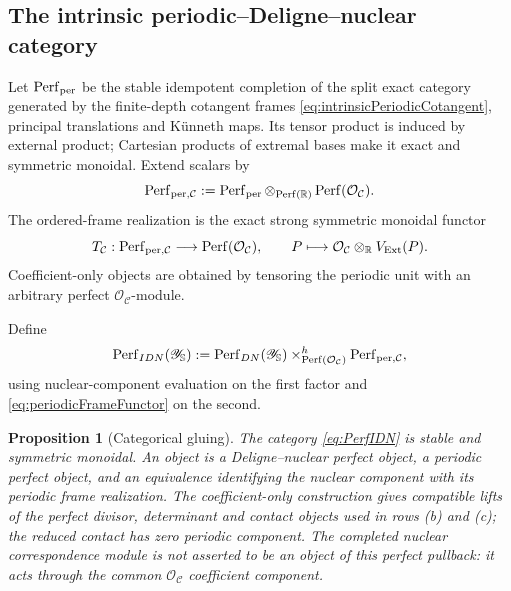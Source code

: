 \documentclass[11pt]{amsart}
\newtheorem{proposition}[theorem]{Proposition}
\theoremstyle{definition}
\theoremstyle{remark}
\newcommand{\R}{\mathbb R}
\begin{document}
\subsection{The intrinsic periodic--Deligne--nuclear category}

Let $\operatorname{Perf}_{\rm per}$ be the stable idempotent completion of
the split exact category generated by the finite-depth cotangent frames
\eqref{eq:intrinsicPeriodicCotangent}, principal translations and K\"unneth
maps.  Its tensor product is induced by external product; Cartesian
products of extremal bases make it exact and symmetric monoidal.  Extend
scalars by
\begin{equation}\label{eq:periodicNuclearCategory}
 \operatorname{Perf}_{\rm per,\mathcal C}
 :=\operatorname{Perf}_{\rm per}
   \otimes_{\operatorname{Perf}(\R)}
   \operatorname{Perf}(\mathcal O_{\mathcal C}).
\end{equation}
The ordered-frame realization is the exact strong symmetric monoidal
functor
\begin{equation}\label{eq:periodicFrameFunctor}
 T_{\mathcal C}:\operatorname{Perf}_{\rm per,\mathcal C}
 \longrightarrow\operatorname{Perf}(\mathcal O_{\mathcal C}),
 \qquad
 P\longmapsto\mathcal O_{\mathcal C}\otimes_\R V_{\rm Ext}(P).
\end{equation}
Coefficient-only objects are obtained by tensoring the periodic unit with
an arbitrary perfect $\mathcal O_{\mathcal C}$-module.

Define
\begin{equation}\label{eq:PerfIDN}
 \operatorname{Perf}_{IDN}(\mathscr Y_{\mathbb S})
 :=\operatorname{Perf}_{DN}(\mathscr Y_{\mathbb S})
 \times^h_{\operatorname{Perf}(\mathcal O_{\mathcal C})}
 \operatorname{Perf}_{\rm per,\mathcal C},
\end{equation}
using nuclear-component evaluation on the first factor and
\eqref{eq:periodicFrameFunctor} on the second.

\begin{proposition}[Categorical gluing]
\label{prop:intrinsicCategoricalGluing}
The category \eqref{eq:PerfIDN} is stable and symmetric monoidal.  An object
is a Deligne--nuclear perfect object, a periodic perfect object, and an
equivalence identifying the nuclear component with its periodic frame
realization.  The coefficient-only construction gives compatible lifts of
the perfect divisor, determinant and contact objects used in rows
\textup{(b)} and \textup{(c)}; the reduced contact has zero periodic
component.  The completed nuclear correspondence module is not asserted to
be an object of this perfect pullback: it acts through the common
$\mathcal O_{\mathcal C}$ coefficient component.
\end{proposition}
\end{document}
